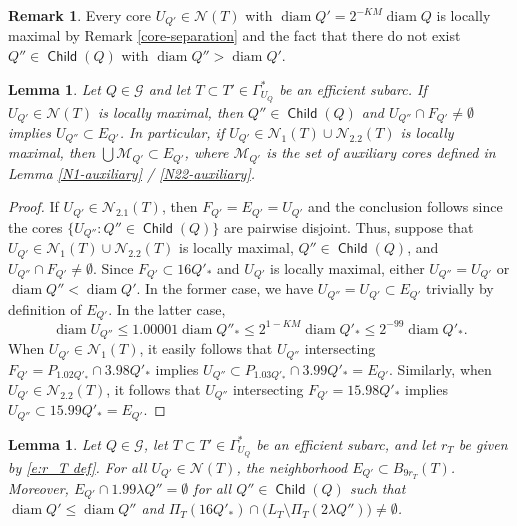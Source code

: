 \documentclass[12pt]{amsart}
\numberwithin{equation}{section}
\theoremstyle{plain}
\newtheorem{lemma}[theorem]{Lemma}
\theoremstyle{definition}
\newtheorem{remark}[theorem]{Remark}
\newcommand{\diam}{\mathop\mathrm{diam}\nolimits}
\newcommand{\Child}{\mathop\mathsf{Child}\nolimits}
\numberwithin{figure}{section}
\begin{document}
\begin{remark}\label{top-level-is-locally-maximal} Every core $U_{Q'}\in\mathcal{N}(T)$ with $\diam Q'=2^{-KM}\diam Q$ is locally maximal by Remark \ref{core-separation} and the fact that there do not exist $Q''\in\Child(Q)$ with $\diam Q''>\diam Q'$.\end{remark}

\begin{lemma}\label{locally-maximal-M's} Let $Q\in\mathscr{G}$ and let $T\subset T'\in\Gamma^*_{U_Q}$ be an efficient subarc. If $U_{Q'}\in\mathcal{N}(T)$ is locally maximal, then $Q''\in\Child(Q)$ and $U_{Q''}\cap F_{Q'}\neq\emptyset$ implies $U_{Q''}\subset E_{Q'}$. In particular, if $U_{Q'}\in\mathcal{N}_1(T)\cup\mathcal{N}_{2.2}(T)$ is locally maximal, then $\bigcup\mathcal{M}_{Q'}\subset E_{Q'}$, where $\mathcal{M}_{Q'}$ is the set of auxiliary cores defined in Lemma \ref{N1-auxiliary} / \ref{N22-auxiliary}.\end{lemma}

\begin{proof} If $U_{Q'}\in\mathcal{N}_{2.1}(T)$, then $F_{Q'}=E_{Q'}=U_{Q'}$ and the conclusion follows since the cores $\{U_{Q''}:Q''\in \Child(Q)\}$ are pairwise disjoint. Thus, suppose that $U_{Q'}\in\mathcal{N}_1(T)\cup\mathcal{N}_{2.2}(T)$ is locally maximal, $Q''\in\Child(Q)$, and $U_{Q''}\cap F_{Q'}\neq\emptyset$. Since $F_{Q'}\subset 16Q'_*$ and $U_{Q'}$ is locally maximal, either $U_{Q''}=U_{Q'}$ or $\diam Q''<\diam Q'$. In the former case, we have $U_{Q''}=U_{Q'}\subset E_{Q'}$ trivially by definition of $E_{Q'}$. In the latter case, $$\diam U_{Q''}\leq 1.00001\diam Q''_* \leq 2^{1-KM}\diam Q'_*\leq 2^{-99}\diam Q'_*.$$ When $U_{Q'}\in\mathcal{N}_1(T)$, it easily follows that $U_{Q''}$ intersecting $F_{Q'}=P_{1.02Q'_*}\cap 3.98Q'_*$ implies $U_{Q''}\subset P_{1.03Q'_*}\cap 3.99Q'_*=E_{Q'}$. Similarly, when $U_{Q'}\in\mathcal{N}_{2.2}(T)$, it follows that $U_{Q''}$ intersecting $F_{Q'}=15.98Q'_*$ implies $U_{Q''}\subset 15.99Q'_*=E_{Q'}$.\end{proof}

\begin{lemma}\label{location-of-E's} Let $Q\in\mathscr{G}$, let $T\subset T'\in\Gamma^*_{U_Q}$ be an efficient subarc, and let $r_T$ be given by \eqref{e:r_T def}. For all $U_{Q'}\in\mathcal{N}(T)$, the neighborhood $E_{Q'}\subset B_{9r_T}(T)$. Moreover, $E_{Q'}\cap 1.99\lambda Q''=\emptyset$ for all $Q''\in\Child(Q)$ such that $\diam Q'\leq \diam Q''$ and $\Pi_T(16Q'_*)\cap \big(L_T\setminus \Pi_T(2\lambda Q'')\big)\neq\emptyset$.\end{lemma}
\end{document}
